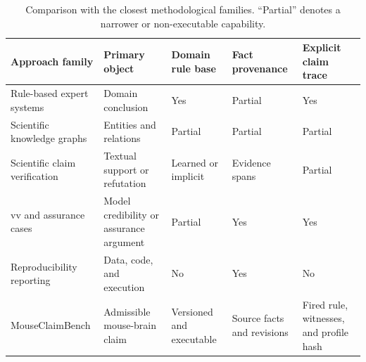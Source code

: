 \begin{table}[t!]
\centering
\caption{Comparison with the closest methodological families. ``Partial'' denotes a narrower or non-executable capability.}
\label{tab:related-work-comparison}
\footnotesize
\renewcommand{\arraystretch}{1.04}
\begin{tabularx}{\textwidth}{@{}p{}p{}p{}p{}Y@{}}
\toprule
Approach family & Primary object & Domain rule base & Fact provenance & Explicit claim trace \\
\midrule
Rule-based expert systems & Domain conclusion & Yes & Partial & Yes \\
Scientific knowledge graphs & Entities and relations & Partial & Partial & Partial \\
Scientific claim verification & Textual support or refutation & Learned or implicit & Evidence spans & Partial \\
\ac{vv} and assurance cases & Model credibility or assurance argument & Partial & Yes & Yes \\
Reproducibility reporting & Data, code, and execution & No & Yes & No \\
MouseClaimBench & Admissible mouse-brain claim & Versioned and executable & Source facts and revisions & Fired rule, witnesses, and profile hash \\
\bottomrule
\end{tabularx}
\end{table}
